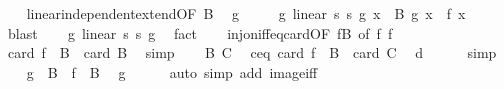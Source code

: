 \begin{isabellebody}
\ \ \isamarkupfalse%
\ linear{\isacharunderscore}{\kern0pt}independent{\isacharunderscore}{\kern0pt}extend{\isacharbrackleft}{\kern0pt}OF\ B{\isacharparenleft}{\kern0pt}{}{\isacharparenright}{\kern0pt}{\isacharbrackright}{\kern0pt}\ \isamarkupfalse%
\ g\ \isanewline
\ \ \ \ g{\isacharcolon}{\kern0pt}\ {\isachardoublequoteopen}linear\ s{}\ s{}\ g{\isachardoublequoteclose}\ {\isachardoublequoteopen}{\isasymforall}x\ {\isasymin}\ B{\isachardot}{\kern0pt}\ g\ x\ {\isacharequal}{\kern0pt}\ f\ x{\isachardoublequoteclose}\ \isamarkupfalse%
\ blast\isanewline
\ \ \isamarkupfalse%
\ g{\isacharcolon}{\kern0pt}\ linear\ s{}\ s{}\ g\ \isamarkupfalse%
\ fact\isanewline
\ \ \isamarkupfalse%
\ inj{\isacharunderscore}{\kern0pt}on{\isacharunderscore}{\kern0pt}iff{\isacharunderscore}{\kern0pt}eq{\isacharunderscore}{\kern0pt}card{\isacharbrackleft}{\kern0pt}OF\ fB{\isacharcomma}{\kern0pt}\ of\ f{\isacharbrackright}{\kern0pt}\ f{\isacharparenleft}{\kern0pt}{}{\isacharparenright}{\kern0pt}\isanewline
\ \ \isamarkupfalse%
\ {\isachardoublequoteopen}card\ {\isacharparenleft}{\kern0pt}f\ {\isacharbackquote}{\kern0pt}\ B{\isacharparenright}{\kern0pt}\ {\isacharequal}{\kern0pt}\ card\ B{\isachardoublequoteclose}\ \isamarkupfalse%
\ simp\isanewline
\ \ \isamarkupfalse%
\ B{\isacharparenleft}{\kern0pt}{}{\isacharparenright}{\kern0pt}\ C{\isacharparenleft}{\kern0pt}{}{\isacharparenright}{\kern0pt}\ \isamarkupfalse%
\ ceq{\isacharcolon}{\kern0pt}\ {\isachardoublequoteopen}card\ {\isacharparenleft}{\kern0pt}f\ {\isacharbackquote}{\kern0pt}\ B{\isacharparenright}{\kern0pt}\ {\isacharequal}{\kern0pt}\ card\ C{\isachardoublequoteclose}\ \isamarkupfalse%
\ d\isanewline
\ \ \ \ \isamarkupfalse%
\ simp\isanewline
\ \ \isamarkupfalse%
\ {\isachardoublequoteopen}g\ {\isacharbackquote}{\kern0pt}\ B\ {\isacharequal}{\kern0pt}\ f\ {\isacharbackquote}{\kern0pt}\ B{\isachardoublequoteclose}\ \isamarkupfalse%
\ g{\isacharparenleft}{\kern0pt}{}{\isacharparenright}{\kern0pt}\isanewline
\ \ \ \ \isamarkupfalse%
\ {\isacharparenleft}{\kern0pt}auto\ simp\ add{\isacharcolon}{\kern0pt}\ image{\isacharunderscore}{\kern0pt}iff{\isacharparenright}{\kern0pt}\isanewline
\ \ \isamarkupfalse%
\ \isamarkupfalse%

\end{isabellebody}
